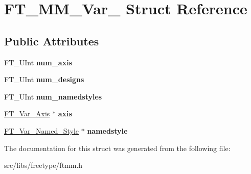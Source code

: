 \hypertarget{struct_f_t___m_m___var__}{
\section{FT\_\-MM\_\-Var\_\- Struct Reference}
\label{struct_f_t___m_m___var__}
}
\subsection*{Public Attributes}
\begin{DoxyCompactItemize}
\item 
\hypertarget{struct_f_t___m_m___var___acd32d4eb128f6fd9f6fde7da4c7b99bf}{
FT\_\-UInt {\bfseries num\_\-axis}}
\label{struct_f_t___m_m___var___acd32d4eb128f6fd9f6fde7da4c7b99bf}

\item 
\hypertarget{struct_f_t___m_m___var___a5109a6a20626d90ed44cd64363d29e92}{
FT\_\-UInt {\bfseries num\_\-designs}}
\label{struct_f_t___m_m___var___a5109a6a20626d90ed44cd64363d29e92}

\item 
\hypertarget{struct_f_t___m_m___var___ac54bdd53447f4967b5d3b1a341a4bdff}{
FT\_\-UInt {\bfseries num\_\-namedstyles}}
\label{struct_f_t___m_m___var___ac54bdd53447f4967b5d3b1a341a4bdff}

\item 
\hypertarget{struct_f_t___m_m___var___a19cc7772e057dad1c4acd6e744328466}{
\hyperlink{struct_f_t___var___axis__}{FT\_\-Var\_\-Axis} $\ast$ {\bfseries axis}}
\label{struct_f_t___m_m___var___a19cc7772e057dad1c4acd6e744328466}

\item 
\hypertarget{struct_f_t___m_m___var___acda1ec5211250ddc06ec090f695adabf}{
\hyperlink{struct_f_t___var___named___style__}{FT\_\-Var\_\-Named\_\-Style} $\ast$ {\bfseries namedstyle}}
\label{struct_f_t___m_m___var___acda1ec5211250ddc06ec090f695adabf}

\end{DoxyCompactItemize}


The documentation for this struct was generated from the following file:\begin{DoxyCompactItemize}
\item 
src/libs/freetype/ftmm.h\end{DoxyCompactItemize}
